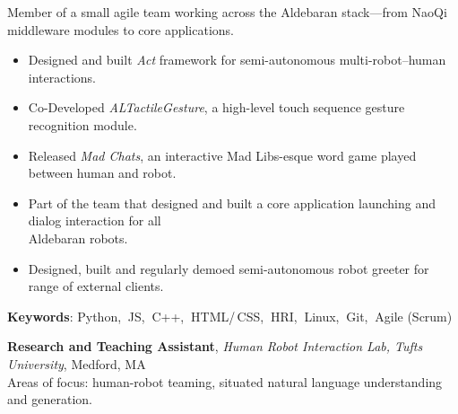 \documentclass[10pt, letter]{article}
\newcommand{\years}[1]{\marginnote{\footnotesize #1}}
\newenvironment{desc*}{
  \begin{description}
    \setlength{\itemsep}{0.2pt}
    \setlength{\parskip}{-1pt}
    \setlength{\parsep}{0pt}
  }{
  \end{description}
}
\begin{document}
\vspace{-.3cm} 
Member of a small agile team working across the Aldebaran stack---from NaoQi middleware modules to core applications.
\begin{itemize}[leftmargin=*, parsep=-1pt]
\item Designed and built \textit{Act} framework for semi-autonomous
  multi-robot--human interactions.
\item Co-Developed \textit{ALTactileGesture}, a high-level touch sequence
  gesture recognition module.
\item Released \textit{Mad Chats}, an interactive Mad Libs-esque word
  game played between human and robot.
\item Part of the team that designed and built a core
  application launching and dialog interaction for all\\
  Aldebaran robots.
\item Designed, built and regularly demoed semi-autonomous robot
  greeter for range of external clients.
\end{itemize}
\vspace{-.2cm}
\begin{desc*}
\item[\rm \color{redblue} \textbf{Keywords}:] Python,$\:$ JS,$\:$ C++,$\:$ HTML/\,CSS,$\:$
  HRI,$\:$ Linux,$\:$ Git,$\:$ Agile (Scrum)\\
\end{desc*}

\vspace{-.2cm}
\years{2012 - 2014} 
\textbf{\fontsize{10.5pt}{1em}\selectfont Research and Teaching Assistant}, 
\textit{Human Robot Interaction Lab, Tufts University}, Medford, MA\\ 

\vspace{-.3cm} 
Areas of focus: human-robot teaming, situated natural language understanding and generation. 

\vspace{-.3cm} 
\end{document}
